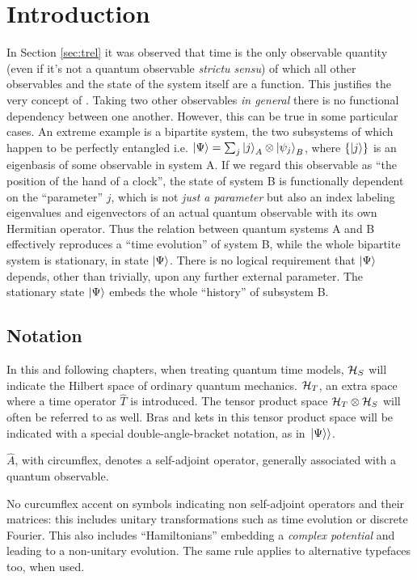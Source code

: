 \section{Introduction}

In Section \ref{sec:trel} it was observed that time is the only observable quantity
(even if it's not a quantum observable \emph{strictu sensu})
of which all other observables and the state of the system itself are a function.
This justifies the very concept of .
Taking two other observables \emph{in general} there is no functional dependency
between one another.
However, this can be true in some particular cases.
An extreme example is a bipartite system,
the two subsystems of which happen to be
perfectly entangled i.e. $ \ket{\Psi} = \sum_{j} \ket{j}_{A} \otimes \ket{\psi_{j}}_{B} $,
where $\qty{\ket{j}}$ is an eigenbasis of some observable in system A.
If we regard this observable as ``the position of the hand of a clock'',
the state of system B is functionally dependent on the ``parameter'' $j$,
which is not \emph{just a parameter} but also an index labeling
eigenvalues and eigenvectors of an actual quantum observable
with its own Hermitian operator.
Thus the relation between quantum systems A and B effectively
reproduces a ``time evolution'' of system B,
while the whole bipartite system
is stationary, in state
$\ket{\Psi}$.
There is no logical requirement that $\ket{\Psi}$
depends, other than trivially,
upon any further external parameter.
The stationary state $\ket{\Psi}$ embeds the whole ``history''
of subsystem B.

\subsection*{Notation}

In this and following chapters, when treating quantum time models,
$\mathcal{H}_S$ will indicate the Hilbert space of ordinary quantum mechanics.
$\mathcal{H}_T$, an extra space where a time operator $\hat{T}$ is introduced. The tensor
product space $\mathcal{H}_T \otimes \mathcal{H}_S$
will often be referred to as well.
Bras and kets in this tensor product space will be indicated with a special double-angle-bracket
notation, as in $\left.\left| \Psi \right\rangle\right\rangle$.

$\hat{A}$, with circumflex, denotes a self-adjoint operator, generally associated with a quantum observable.

No curcumflex accent on symbols indicating non self-adjoint operators and their matrices:
this includes unitary transformations such as
time evolution or discrete Fourier.
This also includes ``Hamiltonians'' embedding a \emph{complex potential}
and leading to a non-unitary evolution. The same rule applies to alternative typefaces too, when used.

